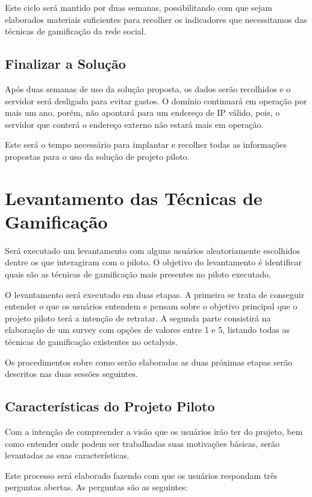 Este ciclo será mantido por duas semanas, possibilitando com que sejam elaborados materiais suficientes para recolher os indicadores que necessitamos 
das técnicas de gamificação da rede social.
\subsection{Finalizar a Solução}
\label{sub:definir_tecnologia}

Após duas semanas de uso da solução proposta, os dados serão recolhidos e o servidor será desligado para evitar gastos. O domínio continuará em operação
por mais um ano, porém, não apontará para um endereço de IP válido, pois, o servidor que conterá o endereço externo não estará mais em operação.

Este será o tempo necessário para implantar e recolher todas as informações propostas para o uso da solução de projeto piloto.

\section{Levantamento das Técnicas de Gamificação}
\label{sub:survey_para_t_cnicas_de_gamifica_o}
Será executado um levantamento com alguns usuários aleatoriamente escolhidos dentre os que interagiram com o piloto.
O objetivo do levantamento é identificar quais são as técnicas de gamificação mais presentes no piloto executado.

O levantamento será executado em duas etapas. A primeira se trata de conseguir entender o que os usuários entendem e pensam sobre o objetivo
principal que o projeto piloto terá a intenção de retratar. A segunda parte consistirá na elaboração de um survey com opções de valores entre 1 e 5,
listando todas as técnicas de gamificação existentes no octalysis.

Os procedimentos sobre como serão elaboradas as duas próximas etapas serão descritos nas duas sessões seguintes. 

\subsection{Características do Projeto Piloto}
\label{sub:caracter_sticas_projeto_do_piloto}
Com a intenção de compreender a visão que os usuários irão ter do projeto, bem como entender onde podem ser trabalhadas suas motivações básicas,
serão levantadas as suas características.

Este processo será elaborado fazendo com que os usuários respondam três perguntas abertas. As perguntas são as seguintes:

